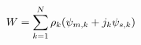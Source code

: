 \documentclass[preview]{standalone}
\begin{document}
\begin{align*}
\special{dvisvgm:raw <g id='unique000'>}W = \sum_{k=1}^{N} \rho_k(\psi_{m,k} + j_k\psi_{s,k})\special{dvisvgm:raw </g>}
\end{align*}
\end{document}
